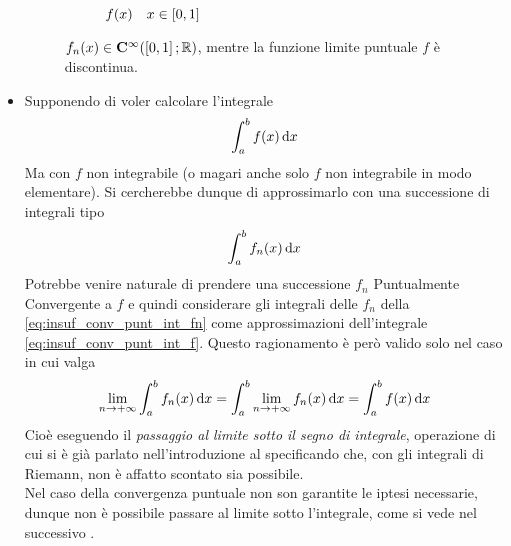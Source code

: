 \begin{itemize}
\begin{figure}[H]
			\begin{subfigure}{.49\textwidth}
				\centering
				\caption{$f(x) \quad x \in \left[0,1\right]$}
			\end{subfigure}
			\caption{$f_n(x) \in \mathbf{C^{\infty}}(\left[0,1\right]; \mathbb{R})$, mentre la funzione limite puntuale $f$ è discontinua.}
			\label{fig:cont_fn_non_passa_a_f}
		\end{figure}
	\item
		Supponendo di voler calcolare l'integrale
		\begin{equation}
			\label{eq:insuf_conv_punt_int_f}
			\int_a^b f(x) \,\mathrm{d}{x}
		\end{equation}
		Ma con $f$ non integrabile (o magari anche solo $f$ non integrabile in modo elementare). Si cercherebbe dunque di approssimarlo con una successione di integrali tipo
		\begin{equation}
			\label{eq:insuf_conv_punt_int_fn}
			\int_a^b f_n(x) \,\mathrm{d}{x}
		\end{equation}
		Potrebbe venire naturale di prendere una successione $f_n$ Puntualmente Convergente a $f$ e quindi considerare gli integrali delle $f_n$ della \cref{eq:insuf_conv_punt_int_fn} come approssimazioni dell'integrale \cref{eq:insuf_conv_punt_int_f}. Questo ragionamento è però valido solo nel caso in cui valga
		\begin{equation}
			\label{eq:conv_punt_pass_lim_integrale}
			\lim\limits_{n \to +\infty} \int_a^b f_n(x) \,\mathrm{d}{x} = \int_a^b \lim\limits_{n \to +\infty} f_n(x) \,\mathrm{d}{x} = \int_a^b f(x) \,\mathrm{d}{x}
		\end{equation}
		Cioè eseguendo il \textit{passaggio al limite sotto il segno di integrale}, operazione di cui si è già parlato nell'introduzione al  specificando che, con gli integrali di Riemann, non è affatto scontato sia possibile.\\
		Nel caso della convergenza puntuale non son garantite le iptesi necessarie, dunque non è possibile passare al limite sotto l'integrale, come si vede nel successivo .
\end{itemize}
